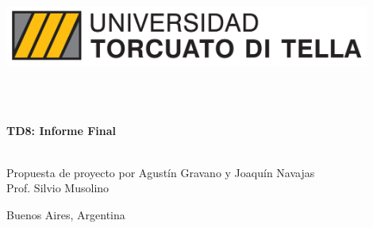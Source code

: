 \begin{center}
    \includegraphics[width=12cm]{figures/logo-utdt.jpg}
    \vspace{15 mm}

    \begin{spacing}{1.3}
        \textbf{\large {\UPMCentre}}\\
        \textbf{\large {\DoctoralProgramme}}\\
        \vspace{30mm}
    \end{spacing}

\begin{spacing}{2.0}
\textbf{\LARGE {\thesisTitle}}
\end{spacing}

\vspace{30 mm}

\begin{spacing}{1.3}
\textbf{\Large {TD8: Informe Final}}\\
\end{spacing}
\end{center}


\begin{center}
\begin{spacing}{1.3}
\textbf{\large {\thesisAuthor}}\\
\medskip
{\large {Propuesta de proyecto por Agustín Gravano y Joaquín Navajas}}\\
\medskip
{\large {Prof. Silvio Musolino}}\\
\end{spacing}
\end{center}

\vspace{\fill}

\begin{center}
    \begin{spacing}{1.3}
        \large {Buenos Aires, Argentina} \\
        \large {\thesisDate}
    \end{spacing}
\end{center}